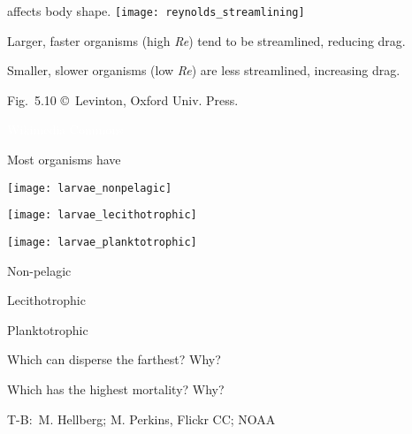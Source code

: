 \documentclass[t]{beamer}
\begin{document}
%
\begin{frame}[t]{ affects body shape.}
	\texttt{[image: reynolds\_streamlining]}
	\begin{multicols}{2}
		\hangpara Larger, faster organisms (high \textit{Re}) tend to be streamlined, reducing drag.

		\columnbreak

		\hangpara Smaller, slower organisms (low \textit{Re}) are less streamlined, increasing drag.

	\end{multicols}

	\vfilll

	\hfill \tiny Fig.~5.10 \copyright\, Levinton, Oxford Univ. Press.
\end{frame}
%
{
\begin{frame}[b]
	\hfill \tiny \textcolor{white}{Wikimedia Commons}
\end{frame}
}
%
\begin{frame}[t]{Most organisms have }
	\begin{multicols}{2}

	\begin{center}
		\texttt{[image: larvae\_nonpelagic]}
		
		\texttt{[image: larvae\_lecithotrophic]}

		\texttt{[image: larvae\_planktotrophic]}
	\end{center}	
	\columnbreak
	
		Non-pelagic
		
		Lecithotrophic
		
		Planktotrophic
		
		\vspace*{\baselineskip}
		
		Which can disperse the farthest? Why?		
		
		\vspace*{\baselineskip}
		
		Which has the highest mortality? Why?
	
	\end{multicols}
	
	\vfilll
	
	\hfill \tiny T-B: \textcopyright\,M. Hellberg; M. Perkins, Flickr CC; NOAA
\end{frame}
%
\end{document}
